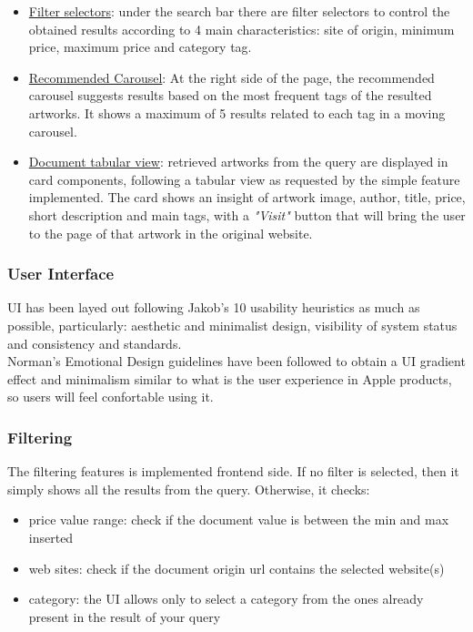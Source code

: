 \documentclass[12pt]{spieman}  %
\begin{document}
\begin{spacing}{1}
    \begin{itemize}
        \item \underline{Filter selectors}: under the search bar there are filter selectors to control the obtained results
              according to 4 main characteristics:
              site of origin, minimum price, maximum price and category tag.
        \item \underline{Recommended Carousel}:
              At the right side of the page, the recommended carousel suggests results based on the most frequent tags
              of the resulted artworks.
              It shows a maximum of 5 results related to each tag in a moving carousel.
        \item \underline{Document tabular view}: retrieved artworks from the query are displayed in card components,
              following a tabular view as requested by the simple feature implemented.
              The card shows an insight of artwork image, author, title, price, short description and main tags,
              with a \textit{"Visit"} button that will bring the user to the page of that artwork in the original website.
    \end{itemize}

    \subsubsection{User Interface}\label{sec:ui}
    UI has been layed out following Jakob's 10 usability heuristics as much as possible, particularly:
    aesthetic and minimalist design, visibility of system status and consistency and standards.\\
    Norman's Emotional Design guidelines have been followed to obtain a UI gradient effect and minimalism similar
    to what is the user experience in Apple products, so users will feel confortable using it.

    \subsubsection{Filtering}\label{sec:filtering}
    The filtering features is implemented frontend side.
    If no filter is selected, then it simply shows all the results from the query.
    Otherwise, it checks:
    \begin{itemize}
        \setlength\itemsep{0.1em}
        \item price value range: check if the document value is between the min and max inserted
        \item web sites: check if the document origin url contains the selected website(s)
        \item category: the UI allows only to select a category from the ones already present in the result of your query
    \end{itemize}



\end{spacing}
\end{document}
